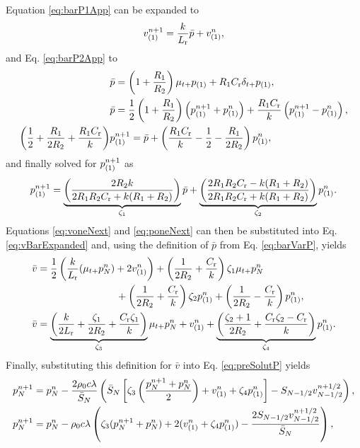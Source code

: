 Equation \eqref{eq:barP1App} can be expanded to 
\begin{equation}\label{eq:voneNext}
    v_{(1)}^{n+1} = \frac{k}{L_{\text{r}}}\bar p + v_{(1)}^n ,
\end{equation}
and Eq. \eqref{eq:barP2App} to 
\begin{align*}
    &\bar p =\left(1+\frac{R_1}{R_2}\right)\mu_{t+}p_{(1)}+ R_1 C_{\text{r}}\delta_{t+}p_{(1)},\\
    &\bar p =\frac{1}{2}\left(1+\frac{R_1}{R_2}\right)\left(p_{(1)}^{n+1} + p_{(1)}^n\right) + \frac{R_1C_{\text{r}}}{k}\left(p_{(1)}^{n+1} - p_{(1)}^n\right),\\
    \left(\frac{1}{2}+\frac{R_1}{2R_2} + \frac{R_1C_{\text{r}}}{k}\right)&p_{(1)}^{n+1} = \bar p + \left(\frac{R_1C_{\text{r}}}{k} - \frac{1}{2} - \frac{R_1}{2R_2}\right)p_{(1)}^n,
\end{align*}
and finally solved for $p_{(1)}^{n+1}$ as
\begin{equation}\label{eq:poneNext}
    p_{(1)}^{n+1} = \underbrace{\left(\frac{2R_2k}{2R_1R_2C_{\text{r}} + k(R_1 + R_2)}\right)}_{\zeta_1}\bar p + \underbrace{\left(\frac{2R_1R_2C_{\text{r}} - k(R_1 + R_2)}{2R_1R_2C_{\text{r}} + k(R_1 + R_2)}\right)}_{\zeta_2} p_{(1)}^n .
\end{equation}
Equations \eqref{eq:voneNext} and \eqref{eq:poneNext} can then be substituted into Eq. \eqref{eq:vBarExpanded} and, using the definition of $\bar p$ from Eq. \eqref{eq:barVarP}, yields
\begin{align}
    \bar v &= \frac{1}{2}\left(\frac{k}{L_{\text{r}}}(\mu_{t+}p_N^n) + 2v_{(1)}^n\right)+\left(\frac{1}{2R_2} + \frac{C_{\text{r}}}{k}\right)\zeta_1\mu_{t+}p_N^n\nonumber \\
    & \qquad\qquad\qquad\qquad+ \left(\frac{1}{2R_2} + \frac{C_{\text{r}}}{k}\right)\zeta_2p_{(1)}^n + \left(\frac{1}{2R_2} - \frac{C_{\text{r}}}{k}\right)p_{(1)}^n\nonumber,\\
    \bar v &= \underbrace{\left(\frac{k}{2L_{\text{r}}} + \frac{\zeta_1}{2R_2}+\frac{C_{\text{r}}\zeta_1}{k}\right)}_{\zeta_3}\mu_{t+}p_N^n + v_{(1)}^n + \underbrace{\left(\frac{\zeta_2+1}{2R_2} + \frac{C_{\text{r}}\zeta_2 - C_{\text{r}}}{k}\right)}_{\zeta_4}p_{(1)}^n.
\end{align}
Finally, substituting this definition for $\bar v$ into Eq. \eqref{eq:preSolutP} yields
\begin{align*}
    p_N^{n+1} &= p_N^n - \frac{2\rho_0c\lambda}{\bar S_N}\left(\bar S_N
    \left[\zeta_3\left(\frac{p_N^{n+1} + p_N^n}{2}\right) + v_{(1)}^n + \zeta_4p_{(1)}^n\right] - S_{N-1/2}v_{N-1/2}^{n+1/2}\right),\\
    p_N^{n+1} &= p_N^n - \rho_0c\lambda\left(\zeta_3(p_N^{n+1} + p_N^n) + 2(v_{(1)}^n + \zeta_4p_{(1)}^n)-\frac{2S_{N-1/2}v_{N-1/2}^{n+1/2}}{\bar S_N}\right),
\end{align*}
